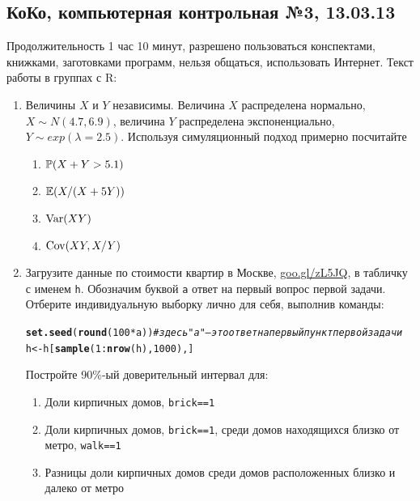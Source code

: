 \documentclass[12pt, a4paper]{article}\usepackage[]{graphicx}\usepackage[]{color}
\makeatletter
\newcommand{\hlnum}[1]{\textcolor[rgb]{0.686,0.059,0.569}{#1}}%
\newcommand{\hlcom}[1]{\textcolor[rgb]{0.678,0.584,0.686}{\textit{#1}}}%
\newcommand{\hlopt}[1]{\textcolor[rgb]{0,0,0}{#1}}%
\newcommand{\hlstd}[1]{\textcolor[rgb]{0.345,0.345,0.345}{#1}}%
\newcommand{\hlkwb}[1]{\textcolor[rgb]{0.69,0.353,0.396}{#1}}%
\newcommand{\hlkwd}[1]{\textcolor[rgb]{0.737,0.353,0.396}{\textbf{#1}}}%
\newenvironment{kframe}{%
 \def\at@end@of@kframe{}%
 \ifinner\ifhmode%
  \def\at@end@of@kframe{\end{minipage}}%
  \begin{minipage}{\columnwidth}%
 \fi\fi%
 \def\FrameCommand##1{\hskip\@totalleftmargin \hskip-\fboxsep
 \colorbox{shadecolor}{##1}\hskip-\fboxsep
     \hskip-\linewidth \hskip-\@totalleftmargin \hskip\columnwidth}%
 \MakeFramed {\advance\hsize-\width
   \@totalleftmargin\z@ \linewidth\hsize
   \@setminipage}}%
 {\par\unskip\endMakeFramed%
 \at@end@of@kframe}
\newenvironment{knitrout}{}{} %
\makeatother
\begin{document}
\subsection{КоКо, компьютерная контрольная №3, 13.03.13}

Продолжительность 1 час 10 минут, разрешено пользоваться конспектами, книжками, заготовками программ, нельзя общаться, использовать Интернет. Текст работы в группах с R:

\begin{enumerate}
\item Величины $X$ и $Y$ независимы. Величина $X$ распределена нормально, $X\sim N(4.7,6.9)$, величина $Y$ распределена экспоненциально, $Y\sim exp(\lambda=2.5)$. Используя симуляционный подход примерно посчитайте

\begin{enumerate}
\item $\P(X+Y>5.1)$
\item $\E(X/(X+5Y))$
\item $\Var(XY)$
\item $\Cov(XY,X/Y)$
\end{enumerate}

\item Загрузите данные по стоимости квартир в Москве, \href{http://goo.gl/zL5JQ}{goo.gl/zL5JQ}, в табличку с именем \verb|h|. Обозначим буквой \verb|a| ответ на первый вопрос первой задачи. Отберите индивидуальную выборку лично для себя, выполнив команды:
\begin{knitrout}
\color{fgcolor}\begin{kframe}
\begin{alltt}
\hlkwd{set.seed}\hlstd{(}\hlkwd{round}\hlstd{(}\hlnum{100} \hlopt{*} \hlstd{a))} \hlcom{# здесь "a" — это ответ на первый пункт первой задачи}
\hlstd{h} \hlkwb{<-} \hlstd{h[}\hlkwd{sample}\hlstd{(}\hlnum{1}\hlopt{:}\hlkwd{nrow}\hlstd{(h),} \hlnum{1000}\hlstd{), ]}
\end{alltt}
\end{kframe}
\end{knitrout}

Постройте 90\%-ый доверительный интервал для:
\begin{enumerate}
\item Доли кирпичных домов, \verb|brick==1|
\item Доли кирпичных домов, \verb|brick==1|, среди домов находящихся близко от метро,  \verb|walk==1|
\item Разницы доли кирпичных домов среди домов расположенных близко и далеко от метро
\end{enumerate}



\end{enumerate}
\end{document}
